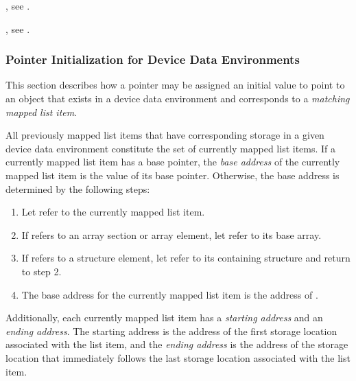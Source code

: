 \begin{crossrefs}
\item {}, see
.

\item {}, see
.
\end{crossrefs}

\begin{ccppspecific}
\subsubsection{Pointer Initialization for Device Data Environments}
\label{subsec:pointer initialization}

This section describes how a pointer may be assigned an initial value to point
to an object that exists in a device data environment and corresponds to a
\emph{matching mapped list item}.

All previously mapped list items that have corresponding storage in a given
device data environment constitute the set of currently mapped list items.  If
a currently mapped list item has a base pointer, the \emph{base address} of
the currently mapped list item is the value of its base pointer. Otherwise,
the base address is determined by the following steps:

\begin{enumerate}
\item Let  refer to the currently mapped list item.

\item If  refers to an array section or array element, let 
    refer to its base array.

\item If  refers to a structure element, let  refer to its
    containing structure and return to step 2.

\item The base address for the currently mapped list item is the address of .
\end{enumerate}

Additionally, each currently mapped list item has a \emph{starting address}
and an \emph{ending address}. The starting address is the address of the
first storage location associated with the list item, and the \emph{ending
address} is the address of the storage location that immediately follows
the last storage location associated with the list item.


\end{ccppspecific}
